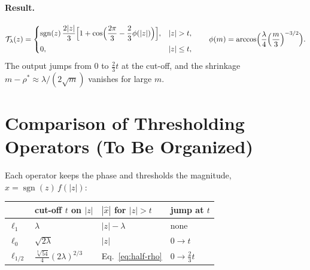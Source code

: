 \documentclass[11pt,a4paper]{article}
\theoremstyle{definition}
\DeclareMathOperator{\sgn}{sgn}
\begin{document}
\paragraph{Result.}
\begin{equation}\label{eq:half}
  \mathcal T_\lambda(z) = \begin{cases}
    \sgn(z)\,\dfrac{2|z|}{3}\Bigl[1+\cos\Bigl(\dfrac{2\pi}{3}-\dfrac{2}{3}\phi(|z|)\Bigr)\Bigr], & |z|>t,\\[1.5ex]
    0, & |z|\le t,\end{cases}
  \qquad \phi(m) = \arccos\Bigl(\frac{\lambda}{4}\Bigl(\frac m3\Bigr)^{-3/2}\Bigr).
\end{equation}
The output jumps from $0$ to $\tfrac23 t$ at the cut-off, and the shrinkage
$m-\rho^\ast \approx \lambda/(2\sqrt m)$ vanishes for large $m$.

\section{Comparison of Thresholding Operators (To Be Organized)}

Each operator keeps the phase and thresholds the magnitude, $\hat x = \sgn(z)\,f(|z|)$:
\begin{center}
\begin{tabular}{@{}llll@{}}
\toprule
 & cut-off $t$ on $|z|$ & $|\hat x|$ for $|z|>t$ & jump at $t$ \\
\midrule
$\ell_1$ & $\lambda$ & $|z|-\lambda$ & none \\
$\ell_0$ & $\sqrt{2\lambda}$ & $|z|$ & $0\to t$ \\
$\ell_{1/2}$ & $\tfrac{\sqrt[3]{54}}{4}(2\lambda)^{2/3}$ & Eq.~\eqref{eq:half-rho} & $0\to\tfrac23 t$ \\
\bottomrule
\end{tabular}
\end{center}
\end{document}
